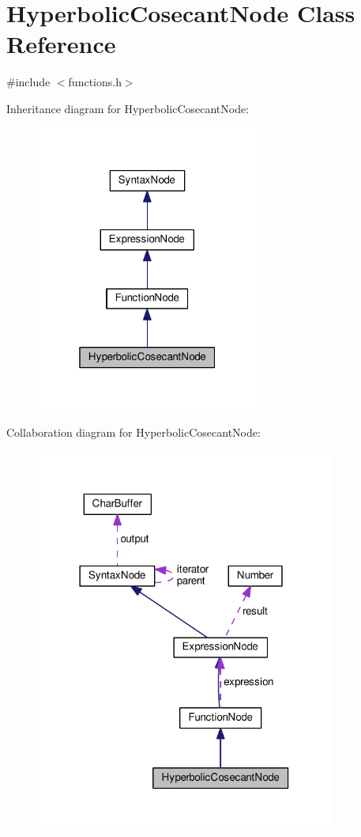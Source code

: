 \hypertarget{classHyperbolicCosecantNode}{}\section{Hyperbolic\+Cosecant\+Node Class Reference}
\label{classHyperbolicCosecantNode}


{\ttfamily \#include $<$functions.\+h$>$}



Inheritance diagram for Hyperbolic\+Cosecant\+Node\+:\nopagebreak
\begin{figure}[H]
\begin{center}
\leavevmode
\includegraphics[width=208pt]{classHyperbolicCosecantNode__inherit__graph}
\end{center}
\end{figure}


Collaboration diagram for Hyperbolic\+Cosecant\+Node\+:\nopagebreak
\begin{figure}[H]
\begin{center}
\leavevmode
\includegraphics[width=278pt]{classHyperbolicCosecantNode__coll__graph}
\end{center}
\end{figure}
